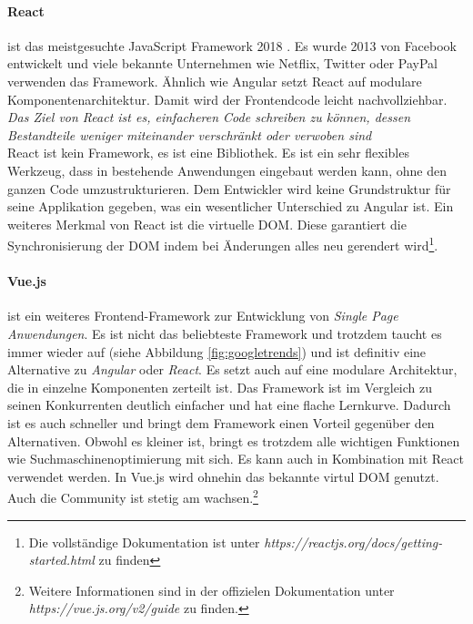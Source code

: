 %
\paragraph{React}
\label{p:react}
%
ist das meistgesuchte JavaScript Framework 2018 \cite{stackoverflow_stack_2018}. Es wurde 2013 von Facebook entwickelt und viele bekannte Unternehmen wie Netflix, Twitter oder PayPal verwenden das Framework. Ähnlich wie Angular setzt React auf modulare Komponentenarchitektur. Damit wird der Frontendcode leicht nachvollziehbar. \textit{\glqq Das Ziel von React ist es, einfacheren Code schreiben zu können, dessen Bestandteile weniger miteinander verschränkt oder verwoben sind \grqq}\cite{kogel_paul_react_2015} \\
React ist kein Framework, es ist eine Bibliothek. Es ist ein sehr flexibles Werkzeug, dass in bestehende Anwendungen eingebaut werden kann, ohne den ganzen Code umzustrukturieren. Dem Entwickler wird keine Grundstruktur für seine Applikation gegeben, was ein wesentlicher Unterschied zu Angular ist. Ein weiteres Merkmal von React ist die virtuelle DOM. Diese garantiert die Synchronisierung der DOM indem bei Änderungen alles neu gerendert wird\footnote{Die vollständige Dokumentation ist unter \textit{https://reactjs.org/docs/getting-started.html} zu finden}.
%
\paragraph{Vue.js}
\label{p:vueJS}
%
ist ein weiteres Frontend-Framework zur Entwicklung von \textit{Single Page Anwendungen}. Es ist nicht das beliebteste Framework und trotzdem taucht es immer wieder auf (siehe Abbildung \ref{fig:googletrends}) und ist definitiv eine Alternative zu \textit{Angular} oder \textit{React}. Es setzt auch auf eine modulare Architektur, die in einzelne Komponenten zerteilt ist. Das Framework ist im Vergleich zu seinen Konkurrenten deutlich einfacher und hat eine flache Lernkurve. Dadurch ist es auch schneller und bringt dem Framework einen Vorteil gegenüber den Alternativen. Obwohl es kleiner ist, bringt es trotzdem alle wichtigen Funktionen wie Suchmaschinenoptimierung mit sich. Es kann auch in Kombination mit React verwendet werden. In Vue.js wird ohnehin das bekannte virtul DOM genutzt. Auch die Community ist stetig am wachsen.\footnote{Weitere Informationen sind in der offizielen Dokumentation unter \emph{https://vue.js.org/v2/guide} zu finden.} \\
%
%
%
%
%
%
